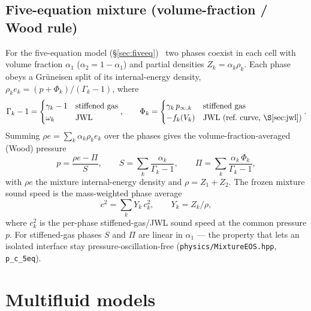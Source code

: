 \documentclass[11pt]{article}
\newcommand{\code}[1]{\texttt{#1}}
\begin{document}
\subsection{Five-equation mixture (volume-fraction / Wood rule)}
\label{sec:eos5eq}
For the five-equation model (\S\ref{sec:fiveeq})~\cite{allaire_2002,murrone_guillard_2005} two phases coexist in each cell
with volume fraction $\alpha_1$ ($\alpha_2 = 1-\alpha_1$) and partial densities
$Z_k = \alpha_k\rho_k$. Each phase obeys a Gr\"uneisen split of its
internal-energy density, $\rho_k e_k = (p + \Phi_k)/(\Gamma_k-1)$, where
\begin{equation}
\Gamma_k - 1 =
\begin{cases} \gamma_k - 1 & \text{stiffened gas} \\ \omega_k & \text{JWL} \end{cases},
\qquad
\Phi_k =
\begin{cases} \gamma_k\,p_{\infty,k} & \text{stiffened gas} \\ -f_k(V_k) & \text{JWL (ref.\ curve, \S\ref{sec:jwl})} \end{cases}.
\end{equation}
Summing $\rho e = \sum_k \alpha_k \rho_k e_k$ over the phases gives the
volume-fraction-averaged (Wood) pressure
\begin{equation}
p = \frac{\rho e - \Pi}{S}, \qquad
S = \sum_k \frac{\alpha_k}{\Gamma_k-1}, \qquad
\Pi = \sum_k \frac{\alpha_k\,\Phi_k}{\Gamma_k-1},
\end{equation}
with $\rho e$ the mixture internal-energy density and $\rho = Z_1+Z_2$. The
frozen mixture sound speed is the mass-weighted phase average
\begin{equation}
c^2 = \sum_k Y_k\,c_k^2, \qquad Y_k = Z_k/\rho,
\end{equation}
where $c_k^2$ is the per-phase stiffened-gas/JWL sound speed at the common
pressure $p$. For stiffened-gas phases $S$ and $\Pi$ are linear in $\alpha_1$ ---
the property that lets an isolated interface stay pressure-oscillation-free
(\code{physics/MixtureEOS.hpp}, \code{p\_c\_5eq}).

\section{Multifluid models}
\label{sec:multifluid}
\end{document}
